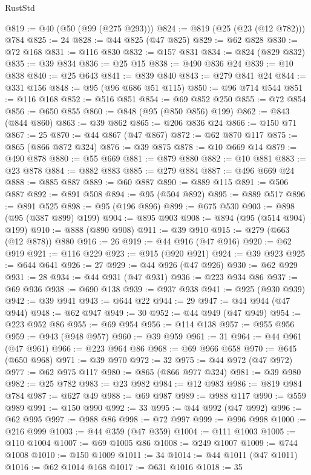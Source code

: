 \begin{lexlean}{RustStd}
\begin{coremodule}
@819 := @40 (@50 (@99 (@275 @293)))
@824 := @819 (@25 (@23 (@12 @782))) @784
@825 := 24
@828 := @44 @825 (@47 @825)
@829 := @62 @828
@830 := @72 @168
@831 := @116 @830
@832 := @157 @831
@834 := @824 (@829 @832)
@835 := @39 @834
@836 := @25 @15
@838 := @490 @836 @24
@839 := @10 @838
@840 := @25 @643
@841 := @839 @840
@843 := @279 @841 @24
@844 := @331 @156
@848 := @95 (@96 @686 @51 @115)
@850 := @96 @714 @544
@851 := @116 @168
@852 := @516 @851
@854 := @69 @852 @250
@855 := @72 @854
@856 := @650 @855
@860 := @848 (@95 (@850 @856) @199)
@862 := @843 (@844 @860)
@863 := @39 @862
@865 := @206 @836 @24
@866 := @150 @71
@867 := 25
@870 := @44 @867 (@47 @867)
@872 := @62 @870 @117
@875 := @865 (@866 @872 @324)
@876 := @39 @875
@878 := @10 @669 @14
@879 := @490 @878
@880 := @55 @669
@881 := @879 @880
@882 := @10 @881
@883 := @23 @878
@884 := @882 @883
@885 := @279 @884
@887 := @496 @669 @24
@888 := @885 @887
@889 := @60 @887
@890 := @889 @115
@891 := @506 @887
@892 := @891 @508
@894 := @95 (@504 @892)
@895 := @889 @517
@896 := @891 @525
@898 := @95 (@196 @896)
@899 := @675 @530
@903 := @898 (@95 (@387 @899) @199)
@904 := @895 @903
@908 := @894 (@95 (@514 @904) @199)
@910 := @888 (@890 @908)
@911 := @39 @910
@915 := @279 (@663 (@12 @878)) @880
@916 := 26
@919 := @44 @916 (@47 @916)
@920 := @62 @919
@921 := @116 @229
@923 := @915 (@920 @921)
@924 := @39 @923
@925 := @644 @641
@926 := 27
@929 := @44 @926 (@47 @926)
@930 := @62 @929
@931 := 28
@934 := @44 @931 (@47 @931)
@936 := @223 @934 @86
@937 := @69 @936
@938 := @690 @138
@939 := @937 @938
@941 := @925 (@930 @939)
@942 := @39 @941
@943 := @644 @22
@944 := 29
@947 := @44 @944 (@47 @944)
@948 := @62 @947
@949 := 30
@952 := @44 @949 (@47 @949)
@954 := @223 @952 @86
@955 := @69 @954
@956 := @114 @138
@957 := @955 @956
@959 := @943 (@948 @957)
@960 := @39 @959
@961 := 31
@964 := @44 @961 (@47 @961)
@966 := @223 @964 @86
@968 := @69 @966 @658
@970 := @645 (@650 @968)
@971 := @39 @970
@972 := 32
@975 := @44 @972 (@47 @972)
@977 := @62 @975 @117
@980 := @865 (@866 @977 @324)
@981 := @39 @980
@982 := @25 @782
@983 := @23 @982
@984 := @12 @983
@986 := @819 @984 @784
@987 := @627 @49
@988 := @69 @987
@989 := @988 @117
@990 := @559 @989
@991 := @150 @990
@992 := 33
@995 := @44 @992 (@47 @992)
@996 := @62 @995
@997 := @988 @86
@998 := @72 @997
@999 := @996 @998
@1000 := @216 @999
@1003 := @44 @359 (@47 @359)
@1004 := @111 @1003
@1005 := @110 @1004
@1007 := @69 @1005 @86
@1008 := @249 @1007
@1009 := @744 @1008
@1010 := @150 @1009
@1011 := 34
@1014 := @44 @1011 (@47 @1011)
@1016 := @62 @1014 @168
@1017 := @631 @1016
@1018 := 35

\end{coremodule}
\end{lexlean}
